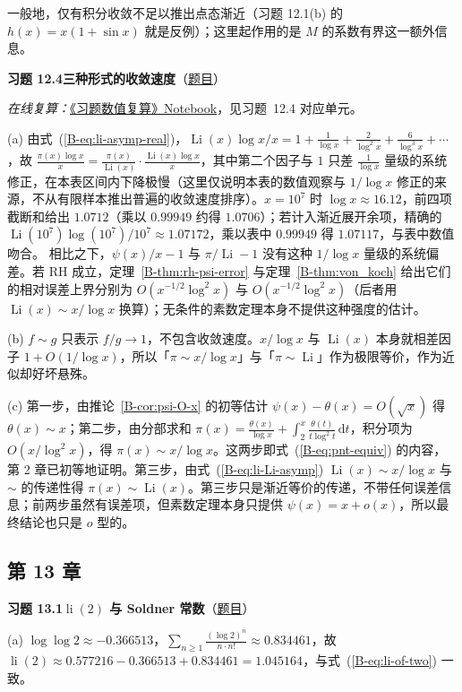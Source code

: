 \documentclass[11pt,a4paper]{article}
\DeclareMathOperator{\Li}{Li}
\DeclareMathOperator{\li}{li}
\newcommand{\dd}{\,\mathrm{d}}
\newcommand{\bref}[1]{\ref*{B-#1}}
\newcommand{\Sol}[2]{%
  \par\addvspace{1.2em}\noindent
  \hypertarget{s:#1}{}\textbf{习题 #1\quad #2}\hfill{\small（\hyperlink{q:#1}{题目}）}\par
  \nopagebreak\smallskip}
\begin{document}
一般地，仅有积分收敛不足以推出点态渐近（习题 12.1(b) 的 $h(x)=x(1+\sin x)$ 就是反例）；这里起作用的是 $M$ 的系数有界这一额外信息。

\Sol{12.4}{三种形式的收敛速度}
\emph{在线复算：}\href{https://colab.research.google.com/github/lichengtong123/lichengtong-RH/blob/main/\%E4\%B9\%A0\%E9\%A2\%98\%E4\%B8\%8E\%E8\%A7\%A3\%E7\%AD\%94/\%E4\%B9\%A0\%E9\%A2\%98\%E6\%95\%B0\%E5\%80\%BC\%E5\%A4\%8D\%E7\%AE\%97.ipynb}{《习题数值复算》Notebook}，见习题~12.4 对应单元。

(a) 由式~(\bref{eq:li-asymp-real})，$\Li(x)\log x/x=1+\frac1{\log x}+\frac2{\log^2x}+\frac6{\log^3x}+\cdots$，故
$\frac{\pi(x)\log x}x=\frac{\pi(x)}{\Li(x)}\cdot\frac{\Li(x)\log x}x$，其中第二个因子与 $1$ 只差 $\frac1{\log x}$ 量级的系统修正，在本表区间内下降极慢（这里仅说明本表的数值观察与 $1/\log x$ 修正的来源，不从有限样本推出普遍的收敛速度排序）。$x=10^7$ 时 $\log x\approx16.12$，前四项截断和给出 $1.0712$（乘以 $0.99949$ 约得 $1.0706$）；若计入渐近展开余项，精确的 $\Li(10^7)\log(10^7)/10^7\approx1.07172$，乘以表中 $0.99949$ 得 $1.07117$，与表中数值吻合。
相比之下，$\psi(x)/x-1$ 与 $\pi/\Li-1$ 没有这种 $1/\log x$ 量级的系统偏差。若 RH 成立，定理~\bref{thm:rh-psi-error} 与定理~\bref{thm:von_koch} 给出它们的相对误差上界分别为 $O(x^{-1/2}\log^2x)$ 与 $O(x^{-1/2}\log^2x)$（后者用 $\Li(x)\sim x/\log x$ 换算）；无条件的素数定理本身不提供这种强度的估计。

(b) $f\sim g$ 只表示 $f/g\to1$，不包含收敛速度。$x/\log x$ 与 $\Li(x)$ 本身就相差因子 $1+O(1/\log x)$，所以「$\pi\sim x/\log x$」与「$\pi\sim\Li$」作为极限等价，作为近似却好坏悬殊。

(c) 第一步，由推论~\bref{cor:psi-O-x} 的初等估计 $\psi(x)-\theta(x)=O(\sqrt x)$ 得 $\theta(x)\sim x$；第二步，由分部求和 $\pi(x)=\frac{\theta(x)}{\log x}+\int_2^x\frac{\theta(t)}{t\log^2t}\dd t$，积分项为 $O(x/\log^2x)$，得 $\pi(x)\sim x/\log x$。这两步即式~(\bref{eq:pnt-equiv}) 的内容，第 2 章已初等地证明。第三步，由式~(\bref{eq:li-Li-asymp}) $\Li(x)\sim x/\log x$ 与 $\sim$ 的传递性得 $\pi(x)\sim\Li(x)$。第三步只是渐近等价的传递，不带任何误差信息；前两步虽然有误差项，但素数定理本身只提供 $\psi(x)=x+o(x)$，所以最终结论也只是 $o$ 型的。

\subsection*{第 13 章}

\Sol{13.1}{$\li(2)$ 与 Soldner 常数}
(a) $\log\log2\approx-0.366513$，$\sum_{n\ge1}\frac{(\log2)^n}{n\cdot n!}\approx0.834461$，故 $\li(2)\approx0.577216-0.366513+0.834461=1.045164$，与式~(\bref{eq:li-of-two}) 一致。
\end{document}
